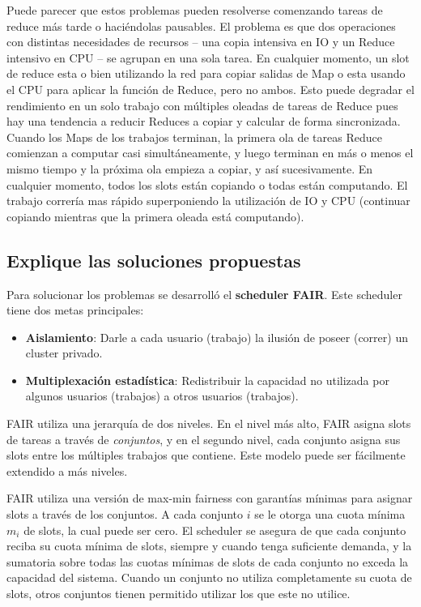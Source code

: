 Puede parecer que estos problemas pueden resolverse comenzando tareas de reduce más tarde o haciéndolas pausables. El problema es que dos operaciones con distintas necesidades de recursos – una copia intensiva en IO y un Reduce intensivo en CPU – se agrupan en una sola tarea. En cualquier momento, un slot de reduce esta o bien utilizando la red para copiar salidas de Map o esta usando el CPU para aplicar la función de Reduce, pero no ambos. Esto puede degradar el rendimiento en un solo trabajo con múltiples oleadas de tareas de Reduce pues hay una tendencia a reducir Reduces a copiar y calcular de forma sincronizada. Cuando los Maps de los trabajos terminan, la primera ola de tareas Reduce comienzan a computar casi simultáneamente, y luego terminan en más o menos el mismo tiempo y la próxima ola empieza a copiar, y así sucesivamente. En cualquier momento, todos los slots están copiando o todas están computando. El trabajo correría mas rápido superponiendo la utilización de IO y CPU (continuar copiando mientras que la primera oleada está computando).


\subsection{Explique las soluciones propuestas}

Para solucionar los problemas se desarrolló el \textbf{scheduler FAIR}. Este scheduler tiene dos metas principales:
\begin{itemize}
	\item \textbf{Aislamiento}: Darle a cada usuario (trabajo) la ilusión de poseer (correr) un cluster privado.
	\item \textbf{Multiplexación estadística}: Redistribuir la capacidad no utilizada por algunos usuarios (trabajos) a otros usuarios (trabajos).
\end{itemize}

FAIR utiliza una jerarquía de dos niveles. En el nivel más alto, FAIR asigna slots de tareas a través de \textit{conjuntos}, y en el segundo nivel, cada conjunto asigna sus slots entre los múltiples trabajos que contiene. Este modelo puede ser fácilmente extendido a más niveles.

FAIR utiliza una versión de max-min fairness con garantías mínimas para asignar slots a través de los conjuntos. A cada conjunto $i$ se le otorga una cuota mínima $m_i$ de slots, la cual puede ser cero. El scheduler se asegura de que cada conjunto reciba su cuota mínima de slots, siempre y cuando tenga suficiente demanda, y la sumatoria sobre todas las cuotas mínimas de slots de cada conjunto no exceda la capacidad del sistema. Cuando un conjunto no utiliza completamente su cuota de slots, otros conjuntos tienen permitido utilizar los que este no utilice.\\

